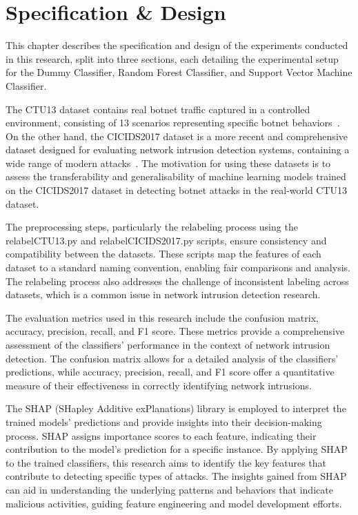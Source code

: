 \chapter{Specification \& Design}

This chapter describes the specification and design of the experiments conducted in this research, split into three sections, each detailing the experimental setup for the Dummy Classifier, Random Forest Classifier, and Support Vector Machine Classifier.

The CTU13 dataset contains real botnet traffic captured in a controlled environment, consisting of 13 scenarios representing specific botnet behaviors~\cite{garcia2014empirical}. On the other hand, the CICIDS2017 dataset is a more recent and comprehensive dataset designed for evaluating network intrusion detection systems, containing a wide range of modern attacks~\cite{sharafaldin2018toward}. The motivation for using these datasets is to assess the transferability and generalisability of machine learning models trained on the CICIDS2017 dataset in detecting botnet attacks in the real-world CTU13 dataset.

The preprocessing steps, particularly the relabeling process using the relabelCTU13.py and relabelCICIDS2017.py scripts, ensure consistency and compatibility between the datasets. These scripts map the features of each dataset to a standard naming convention, enabling fair comparisons and analysis. The relabeling process also addresses the challenge of inconsistent labeling across datasets, which is a common issue in network intrusion detection research.

The evaluation metrics used in this research include the confusion matrix, accuracy, precision, recall, and F1 score. These metrics provide a comprehensive assessment of the classifiers' performance in the context of network intrusion detection. The confusion matrix allows for a detailed analysis of the classifiers' predictions, while accuracy, precision, recall, and F1 score offer a quantitative measure of their effectiveness in correctly identifying network intrusions.

The SHAP (SHapley Additive exPlanations) library is employed to interpret the trained models' predictions and provide insights into their decision-making process. SHAP assigns importance scores to each feature, indicating their contribution to the model's prediction for a specific instance. By applying SHAP to the trained classifiers, this research aims to identify the key features that contribute to detecting specific types of attacks. The insights gained from SHAP can aid in understanding the underlying patterns and behaviors that indicate malicious activities, guiding feature engineering and model development efforts.

